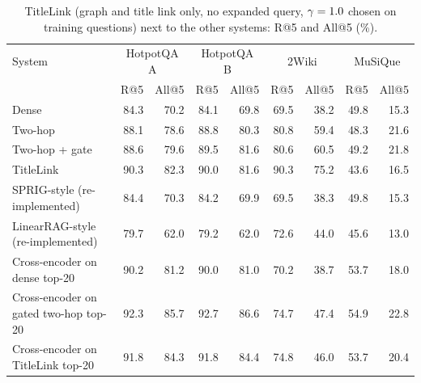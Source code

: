 \begin{table}[t]
\centering
\footnotesize
\caption{TitleLink (graph and title link only, no expanded query, $\gamma=1.0$ chosen on training questions) next to the other systems: R@5 and All@5 (\%).}
\label{tab:titlelink}
\begin{tabular}{lrrrrrrrr}
\toprule
System & \multicolumn{2}{c}{HotpotQA A} & \multicolumn{2}{c}{HotpotQA B} & \multicolumn{2}{c}{2Wiki} & \multicolumn{2}{c}{MuSiQue} \\
& R@5 & All@5 & R@5 & All@5 & R@5 & All@5 & R@5 & All@5 \\
\midrule
Dense & 84.3 & 70.2 & 84.1 & 69.8 & 69.5 & 38.2 & 49.8 & 15.3 \\
Two-hop & 88.1 & 78.6 & 88.8 & 80.3 & 80.8 & 59.4 & 48.3 & 21.6 \\
Two-hop + gate & 88.6 & 79.6 & 89.5 & 81.6 & 80.6 & 60.5 & 49.2 & 21.8 \\
TitleLink & 90.3 & 82.3 & 90.0 & 81.6 & 90.3 & 75.2 & 43.6 & 16.5 \\
SPRIG-style (re-implemented) & 84.4 & 70.3 & 84.2 & 69.9 & 69.5 & 38.3 & 49.8 & 15.3 \\
LinearRAG-style (re-implemented) & 79.7 & 62.0 & 79.2 & 62.0 & 72.6 & 44.0 & 45.6 & 13.0 \\
Cross-encoder on dense top-20 & 90.2 & 81.2 & 90.0 & 81.0 & 70.2 & 38.7 & 53.7 & 18.0 \\
Cross-encoder on gated two-hop top-20 & 92.3 & 85.7 & 92.7 & 86.6 & 74.7 & 47.4 & 54.9 & 22.8 \\
Cross-encoder on TitleLink top-20 & 91.8 & 84.3 & 91.8 & 84.4 & 74.8 & 46.0 & 53.7 & 20.4 \\
\bottomrule
\end{tabular}
\end{table}
